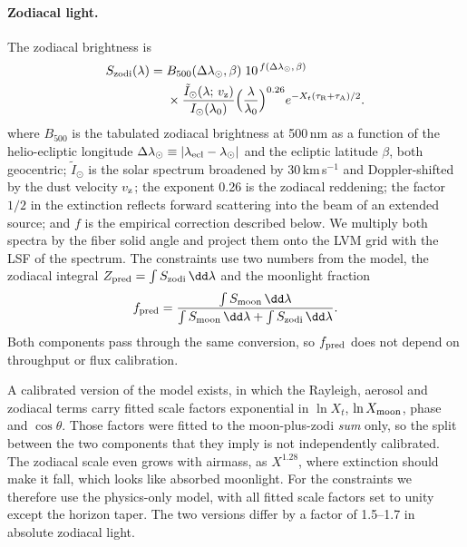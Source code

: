 \paragraph{Zodiacal light.} The zodiacal brightness is
\begin{equation}
\begin{split}
  S_{\rm zodi}(\lambda) = {}&B_{500}(\Delta\lambda_\odot,\beta)\;
  10^{\,f(\Delta\lambda_\odot,\,\beta)}\\
  &\times\frac{\tilde I_\odot(\lambda;\,v_{\rm z})}{I_\odot(\lambda_0)}
  \Big(\frac{\lambda}{\lambda_0}\Big)^{0.26}
  e^{-X_t(\tau_{\rm R}+\tau_{\rm A})/2}.
\end{split}
  \label{eq:zodimodel}
\end{equation}
where $B_{500}$ is the tabulated zodiacal brightness at 500\,nm
\citep{Leinert1998} as a function of the helio-ecliptic longitude
$\Delta\lambda_\odot \equiv |\lambda_{\rm ecl}-\lambda_\odot|$ and the
ecliptic latitude $\beta$, both geocentric; $\tilde I_\odot$ is the solar
spectrum broadened by 30\,km\,s$^{-1}$ and Doppler-shifted by the dust
velocity $v_{\rm z}$; the exponent 0.26 is the zodiacal reddening; the
factor $1/2$ in the extinction reflects forward scattering into the beam of
an extended source; and $f$ is the empirical correction described below.
We multiply both spectra by the fiber solid angle and project them onto the
LVM grid with the LSF of the spectrum. The constraints use two numbers from
the model, the zodiacal integral
$Z_{\rm pred} = \int S_{\rm zodi}\,\dd\lambda$ and the moonlight fraction
\begin{equation}
  f_{\rm pred} = \frac{\int S_{\rm moon}\,\dd\lambda}
  {\int S_{\rm moon}\,\dd\lambda + \int S_{\rm zodi}\,\dd\lambda}.
\end{equation}
Both components pass through the same conversion, so $f_{\rm pred}$ does not
depend on throughput or flux calibration.

A calibrated version of the model exists, in which the Rayleigh, aerosol and
zodiacal terms carry fitted scale factors exponential in $\ln X_t$,
$\ln X_{\rm moon}$, phase and $\cos\theta$. Those factors were fitted to the
moon-plus-zodi \emph{sum} only, so the split between the two components that
they imply is not independently calibrated. The zodiacal scale even grows
with airmass, as $X^{1.28}$, where extinction should make it fall, which
looks like absorbed moonlight. For the constraints we therefore use the
physics-only model, with all fitted scale factors set to unity except the
horizon taper. The two versions differ by a factor of 1.5--1.7 in absolute
zodiacal light.

